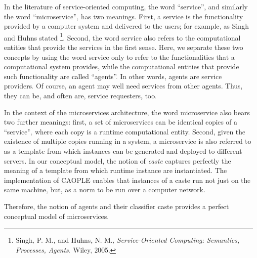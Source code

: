 \documentclass[english]{report}
\begin{document}
In the literature of service-oriented computing, the word ``service'', and similarly the word ``microservice'', has two meanings. First, a service is the functionality provided by a computer system and delivered to the users; for example, as Singh and Huhns stated \footnote{Singh, P. M., and Huhns, N. M.,  \emph{Service-Oriented Computing: Semantics, Processes, Agents.} Wiley, 2005.}. Second, the word service also refers to the computational entities that provide the services in the first sense. Here, we separate these two concepts by using the word service only to refer to the functionalities that a computational system provides, while the computational entities that provide such functionality are called ``agents''. In other words, agents are service providers. Of course, an agent may well need services from other agents. Thus, they can be, and often are, service requesters, too. 

In the context of the microservices architecture, the word microservice also bears two further meanings: first, a set of microservices can be identical copies of a ``service'', where each copy is a runtime computational entity. Second, given the existence of multiple copies running in a system, a microservice is also referred to as a template from which instances can be generated and deployed to different servers. In our conceptual model, the notion of \emph{caste} captures perfectly the meaning of a template from which runtime instance are instantiated. The implementation of CAOPLE enables that instances of a caste run not just on the same machine, but, as a norm to be run over a computer network. 

Therefore, the notion of agents and their classifier caste provides a perfect conceptual model of microservices. 
\end{document}

